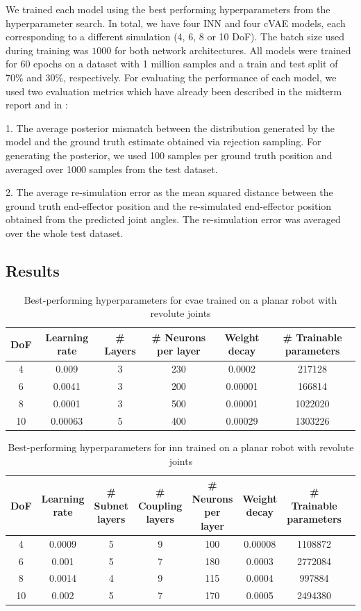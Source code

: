 \documentclass[conference]{IEEEtran}
\begin{document}
We trained each model using the best performing hyperparameters from the hyperparameter search. In total, we have four INN and four cVAE models, each corresponding to a different simulation (4, 6, 8 or 10 DoF). The batch size used during training was $1000$ for both network architectures. All models were trained for 60 epochs on a dataset with 1 million samples and a train and test split of 70\% and 30\%, respectively. For evaluating the performance of each model, we used two evaluation metrics which have already been described in the midterm report and in \cite{Kruse2019}:

1. The average posterior mismatch between the distribution generated by the model and the ground truth estimate obtained via rejection sampling. For generating the posterior, we used 100 samples per ground truth position and averaged over 1000 samples from the test dataset.

2. The average re-simulation error as the mean squared distance between the ground truth end-effector position and the re-simulated end-effector position obtained from the predicted joint angles. The re-simulation error was averaged over the whole test dataset.

\subsection*{Results}

\begin{table}[b]
\caption{Best-performing hyperparameters for cvae trained on a planar robot with revolute joints}
\label{tab:results:cvae}
\centering
\begin{tabular}{|c|c|c|c|c|c|}
\hline
DoF & Learning rate & \# Layers & \# Neurons per layer & Weight decay & \# Trainable parameters \\
\hline
4  & 0.009 & 3 & 230 & 0.0002 & 217128 \\
6  & 0.0041 & 3 & 200 & 0.00001 & 166814 \\
8  & 0.0001 & 3 & 500 & 0.00001 & 1022020 \\
10  & 0.00063 & 5 & 400 & 0.00029 & 1303226 \\
\hline
\end{tabular}
\end{table}

\begin{table}[b]
\caption{Best-performing hyperparameters for inn trained on a planar robot with revolute joints}
\label{tab:results:inn}
\centering
\begin{tabular}{|c|c|c|c|c|c|c|c|}
\hline
DoF & Learning rate & \# Subnet layers & \# Coupling layers & \# Neurons per layer & Weight decay & \# Trainable parameters \\
\hline
4  & 0.0009 & 5 & 9 & 100 & 0.00008 & 1108872 \\
6  & 0.001 & 5 & 7 & 180 & 0.0003 & 2772084 \\
8  & 0.0014 & 4 & 9 & 115 & 0.0004 & 997884 \\
10  & 0.002 & 5 & 7 & 170 & 0.0005 & 2494380 \\
\hline
\end{tabular}
\end{table}
\end{document}
